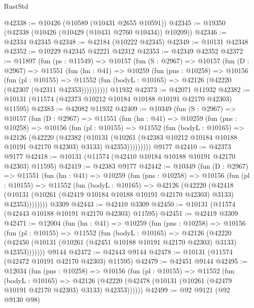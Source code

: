 \begin{lexlean}{RustStd}
\begin{coremodule}
@42338 := @10426 (@10589 (@10431 @2655 @10591))
@42345 := @19350 (@42338 (@10426 (@10429 (@10431 @2760 @10434)) @10209))
@42346 := @42334 @42345
@42348 := @42184 (@10222 @42345)
@42349 := @10131 @42348
@42352 := @10229 @42345 @42221 @42312
@42353 := @42349 @42352
@42372 := @11897
    (fun (ps : @11549) =>
    @10157
      (fun (S : @2967) =>
      @10157
        (fun (D : @2967) =>
        @11551
          (fun (hn : @41) =>
          @10259
            (fun (pns : @10258) =>
            @10156
              (fun (pl : @10155) =>
              @11552 (fun (bodyL : @10165) => @42126 (@42220 (@42307 (@42311 @42353))))))))))
    @11932
@42373 := @42071 @11932
@42382 := @10131 (@11574 (@42373 @10212 @10184 @10188 @10191 @42170 @42303) @11595)
@42383 := @42082 @11932
@42409 := @10349
    (fun (S : @2967) =>
    @10157
      (fun (D : @2967) =>
      @11551
        (fun (hn : @41) =>
        @10259
          (fun (pns : @10258) =>
          @10156
            (fun (pl : @10155) =>
            @11552
              (fun (bodyL : @10165) =>
              @42126
                (@42220
                  (@42382
                    (@10131
                      (@10261 (@42383 @10212 @10184 @10188 @10191 @42170 @42303) @3133)
                      @42353)))))))))
    @9177
@42410 := @42373 @9177
@42418 := @10131 (@11574 (@42410 @10184 @10188 @10191 @42170 @42303) @11595)
@42419 := @42383 @9177
@42442 := @10349
    (fun (D : @2967) =>
    @11551
      (fun (hn : @41) =>
      @10259
        (fun (pns : @10258) =>
        @10156
          (fun (pl : @10155) =>
          @11552
            (fun (bodyL : @10165) =>
            @42126
              (@42220
                (@42418
                  (@10131 (@10261 (@42419 @10184 @10188 @10191 @42170 @42303) @3133) @42353))))))))
    @3309
@42443 := @42410 @3309
@42450 := @10131 (@11574 (@42443 @10188 @10191 @42170 @42303) @11595)
@42451 := @42419 @3309
@42471 := @12004
    (fun (hn : @41) =>
    @10259
      (fun (pns : @10258) =>
      @10156
        (fun (pl : @10155) =>
        @11552
          (fun (bodyL : @10165) =>
          @42126
            (@42220
              (@42450 (@10131 (@10261 (@42451 @10188 @10191 @42170 @42303) @3133) @42353)))))))
    @9144
@42472 := @42443 @9144
@42478 := @10131 (@11574 (@42472 @10191 @42170 @42303) @11595)
@42479 := @42451 @9144
@42495 := @12034
    (fun (pns : @10258) =>
    @10156
      (fun (pl : @10155) =>
      @11552
        (fun (bodyL : @10165) =>
        @42126 (@42220 (@42478 (@10131 (@10261 (@42479 @10191 @42170 @42303) @3133) @42353))))))
@42499 := @92 @9121 (@92 @9130 @98)

\end{coremodule}
\end{lexlean}
